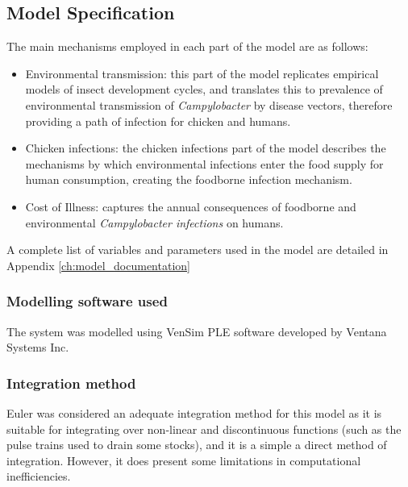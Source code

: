 \subsection{Model Specification}
The main mechanisms employed in each part of the model are as follows:
\begin{itemize}
    \item Environmental transmission: this part of the model replicates empirical models of insect development cycles, and translates this to prevalence of environmental transmission of \textit{Campylobacter} by disease vectors, therefore providing a path of infection for chicken and humans.
    \item Chicken infections: the chicken infections part of the model describes the mechanisms by which environmental infections enter the food supply for human consumption, creating the foodborne infection mechanism.
    \item Cost of Illness: captures the annual consequences of foodborne and environmental \textit{Campylobacter infections} on humans. %
    
\end{itemize} %

A complete list of variables and parameters used in the model are detailed in Appendix \ref{ch:model_documentation}

\subsubsection{Modelling software used}
The system was modelled using VenSim PLE software developed by Ventana Systems Inc.
    
\subsubsection{Integration method}
Euler was considered an adequate integration method for this model as it is suitable for integrating over non-linear and discontinuous functions (such as the pulse trains used to drain some stocks), and it is a simple a direct method of integration. However, it does present some limitations in computational inefficiencies.

